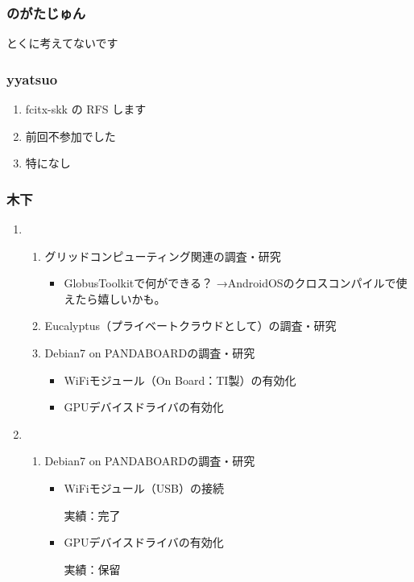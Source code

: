 \documentclass[cjk,dvipdfmx,10pt,compress,%
hyperref={bookmarks=true,bookmarksnumbered=true,bookmarksopen=false,%
colorlinks=false,%
pdftitle={第 82 回 関西 Debian 勉強会},%
pdfauthor={倉敷・のがた・佐々木・かわだ・八津尾},%
pdfsubject={資料},%
}]{beamer}
\begin{document}

\begin{frame}
  \frametitle{ のがたじゅん }

とくに考えてないです
\end{frame}

\begin{frame}
  \frametitle{ yyatsuo }
  \begin{enumerate}
  \item fcitx-skk の RFS します
  \item 前回不参加でした
  \item 特になし
  \end{enumerate}
\end{frame}

\begin{frame}
  \frametitle{ 木下 }
  \begin{enumerate}
  \item
    \begin{enumerate}
    \item グリッドコンピューティング関連の調査・研究
      \begin{itemize}
      \item GlobusToolkitで何ができる？
        →AndroidOSのクロスコンパイルで使えたら嬉しいかも。
      \end{itemize}
    \item Eucalyptus（プライベートクラウドとして）の調査・研究
    \item Debian7 on PANDABOARDの調査・研究
      \begin{itemize}
      \item WiFiモジュール（On Board：TI製）の有効化
      \item GPUデバイスドライバの有効化
      \end{itemize}
    \end{enumerate}
  \item
    \begin{enumerate}
    \item Debian7 on PANDABOARDの調査・研究
      \begin{itemize}
      \item WiFiモジュール（USB）の接続

        実績：完了
      \item GPUデバイスドライバの有効化

        実績：保留
      \end{itemize}
    \end{enumerate}
  \end{enumerate}
\end{frame}
\end{document}
